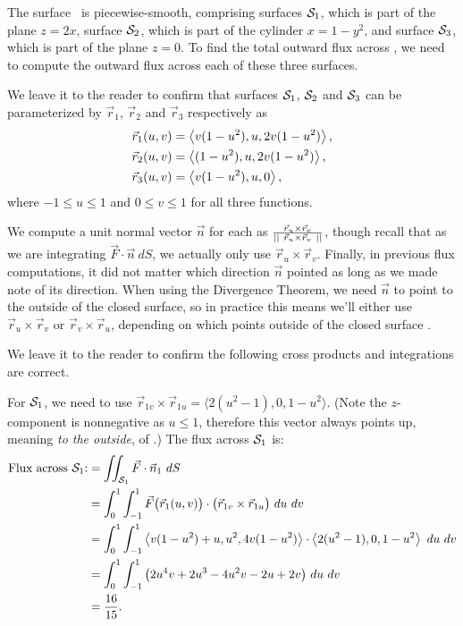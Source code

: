 {The surface \surfaceS\ is piecewise-smooth, comprising surfaces $\mathcal{S}_1$, which is part of the plane $z=2x$, surface $\mathcal{S}_2$, which is part of the cylinder $x=1-y^2$, and surface $\mathcal{S}_3$, which is part of the plane $z=0$. To find the total outward flux across \surfaceS, we need to compute the outward flux across each of these three surfaces.

We leave it to the reader to confirm that surfaces $\mathcal{S}_1$, $\mathcal{S}_2$ and $\mathcal{S}_3$ can be parameterized by $\vec r_1$, $\vec r_2$ and $\vec r_3$ respectively as
\begin{align*}
\vec r_1(u,v) &= \left\langle v(1-u^2), u, 2v(1-u^2)\right\rangle, \\
\vec r_2(u,v) &= \left\langle (1-u^2), u, 2v(1-u^2)\right\rangle,\\
\vec r_3(u,v) &= \left\langle v(1-u^2), u, 0\right\rangle,
\end{align*}
where $-1\leq u\leq 1$ and $0\leq v\leq 1$ for all three functions.

We compute a unit normal vector $\vec n$ for each as $\frac{\vec r_u\times\vec r_v}{\left|\left|\ \vec r_u\times\vec r_v\ \right|\right|}$, though recall that as we are integrating $\vec F\cdot \vec n\ dS$, we actually only use $\vec r_u\times\vec r_v$. Finally, in previous flux computations, it did not matter which direction $\vec n$ pointed as long as we made note of its direction. When using the Divergence Theorem, we need $\vec n$ to point to the outside of the closed surface, so in practice this means we'll either use $\vec r_u\times\vec r_v$ or $\vec r_v\times\vec r_u$, depending on which points outside of the closed surface \surfaceS.

We leave it to the reader to confirm the following cross products and integrations are correct.
\drawexampleline

For $\mathcal{S}_1$, we need to use $\vec r_{1v}\times\vec r_{1u} = \langle 2(u^2-1),0,1-u^2\rangle$. (Note the $z$-component is nonnegative as $u\leq 1$, therefore this vector always points up, meaning \emph{to the outside}, of \surfaceS.) The flux across $\mathcal{S}_1$ is:
\begin{align*}
\text{Flux across $\surfaceS_1$:} &= \iint_{\surfaceS_1} \vec F\cdot \vec n_1\ dS \\
		&= \int_0^1\int_{-1}^1 \vec F\big(\vec r_1(u,v)\big)\cdot \big(\vec r_{1v}\times\vec r_{1u}\big)\ du\ dv\\
		&= \int_0^1\int_{-1}^1 \la v(1-u^2)+u, u^2,4v(1-u^2)\ra \cdot \la 2(u^2-1),0,1-u^2\ra\ du\ dv\\
		&= \int_0^1\int_{-1}^1 \big(2u^4v+2u^3-4u^2v-2u+2v\big)\ du\ dv\\
		&= \frac{16}{15}.
\end{align*}

}

